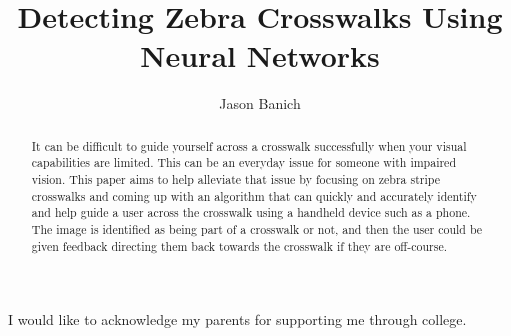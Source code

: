 \documentclass[12pt]{ucthesis}
\begin{document}

\title{Detecting Zebra Crosswalks Using Neural Networks}
\author{Jason Banich}
  
 
    



\maketitle

\begin{frontmatter}

\copyrightpage

\committeemembershippage

\begin{abstract}
It can be difficult to guide yourself across a crosswalk successfully when your visual capabilities are limited. This can be an everyday issue for someone with impaired vision. This paper aims to help alleviate that issue by focusing on zebra stripe crosswalks and coming up with an algorithm that can quickly and accurately identify and help guide a user across the crosswalk using a handheld device such as a phone. The image is identified as being part of a crosswalk or not, and then the user could be given feedback directing them back towards the crosswalk if they are off-course.


\end{abstract}

\begin{acknowledgements}
I would like to acknowledge my parents for supporting me through college.
\end{acknowledgements}


\tableofcontents


\listoftables

\listoffigures

\end{frontmatter}
\end{document}
